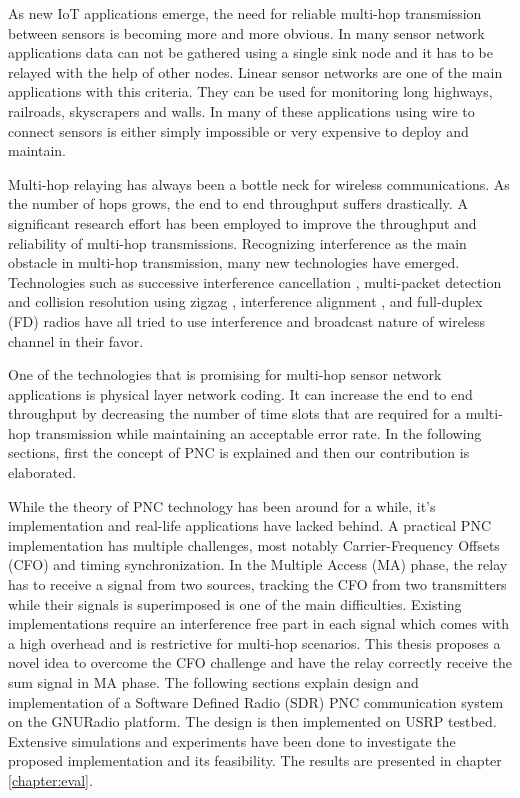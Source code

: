 \label{chapter:multi}

As new IoT applications emerge, the need for reliable multi-hop transmission between sensors is becoming more and more obvious. In many sensor network applications data can not be gathered using a single sink node and it has to be relayed with the help of other nodes. Linear sensor networks are one of the main applications with this criteria. They can be used for monitoring long highways, railroads, skyscrapers and walls. In many of these applications using wire to connect sensors is either simply impossible or very expensive to deploy and maintain.

Multi-hop relaying has always been a bottle neck for wireless communications. As the number of hops grows, the end to end throughput suffers drastically. A significant research effort has been employed to improve the throughput and reliability of multi-hop transmissions. Recognizing interference as the main obstacle in multi-hop transmission, many new technologies have emerged. Technologies such as successive interference cancellation \cite{alvandi2015delay}, multi-packet detection and collision resolution using zigzag \cite{mzig}, interference alignment \cite{4567443, 7218598}, and full-duplex (FD) radios \cite{fullduplex} have all tried to use interference and broadcast nature of wireless channel in their favor.

One of the technologies that is promising for multi-hop sensor network applications is physical layer network coding. It can increase the end to end throughput by decreasing the number of time slots that are required for a multi-hop transmission while maintaining an acceptable error rate. In the following sections, first the concept of PNC is explained and then our contribution is elaborated.


While the theory of PNC technology has been around for a while, it's implementation and real-life applications have lacked behind. A practical PNC implementation has multiple challenges, most notably Carrier-Frequency Offsets (CFO) and timing synchronization. In the Multiple Access (MA) phase, the relay has to receive a signal from two sources, tracking the CFO from two transmitters while their signals is superimposed is one of the main difficulties. Existing implementations require an interference free part in each signal which comes with a high overhead and is restrictive for multi-hop scenarios. This thesis proposes a novel idea to overcome the CFO challenge and have the relay correctly receive the sum signal in MA phase. The following sections explain design and implementation of a Software Defined Radio (SDR) PNC communication system on the GNURadio platform. The design is then implemented on USRP testbed. Extensive simulations and experiments have been done to investigate the proposed implementation and its feasibility. The results are presented in chapter \ref{chapter:eval}.

